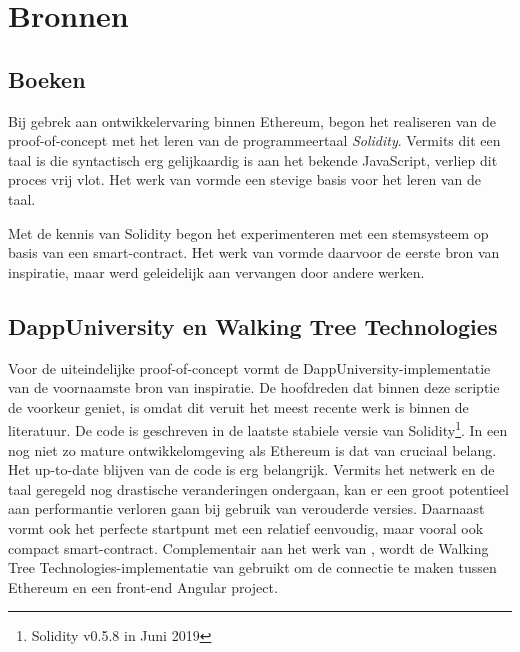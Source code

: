 \section{Bronnen}
	\subsection{Boeken}
	Bij gebrek aan ontwikkelervaring binnen Ethereum, begon het realiseren van de proof-of-concept met het leren van de programmeertaal \textit{Solidity}. Vermits dit een taal is die syntactisch erg gelijkaardig is aan het bekende JavaScript, verliep dit proces vrij vlot. Het werk van \textcite{Antonopoulos2018} vormde een stevige basis voor het leren van de taal.
	
	Met de kennis van Solidity begon het experimenteren met een stemsysteem op basis van een smart-contract. Het werk van \textcite{Mukhopadhyay2018} vormde daarvoor de eerste bron van inspiratie, maar werd geleidelijk aan vervangen door andere werken.
	
	\subsection{DappUniversity en Walking Tree Technologies}
	Voor de uiteindelijke proof-of-concept vormt de DappUniversity-implementatie van \textcite{McCubin2019}  de voornaamste bron van inspiratie. De hoofdreden dat \textcite{McCubin2019} binnen deze scriptie de voorkeur geniet, is omdat dit veruit het meest recente werk is binnen de literatuur. De code is geschreven in de laatste stabiele versie van Solidity\footnote{Solidity v0.5.8 in Juni 2019}. In een nog niet zo mature ontwikkelomgeving als Ethereum is dat van cruciaal belang. Het up-to-date blijven van de code is erg belangrijk. Vermits het netwerk en de taal geregeld nog drastische veranderingen ondergaan, kan er een groot potentieel aan performantie verloren gaan bij gebruik van verouderde versies. Daarnaast vormt \textcite{McCubin2019} ook het perfecte startpunt met een relatief eenvoudig, maar vooral ook compact smart-contract. Complementair aan het werk van \textcite{McCubin2019}, wordt de Walking Tree Technologies-implementatie van \textcite{Ranjan2018} gebruikt om de connectie te maken tussen Ethereum en een front-end Angular project.
	

